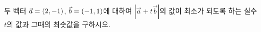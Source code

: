 두 벡터 $\vec{a}=(2{,}\mkern3mu\mathopen{}-1)$, $\vec{b}=(-1{,}\mkern3mu\mathopen{}1)$에 대하여 $|\vec{a}+t\vec{b}|$의 값이 최소가 되도록 하는 실수 $t$의 값과 그때의 최솟값을 구하시오.
